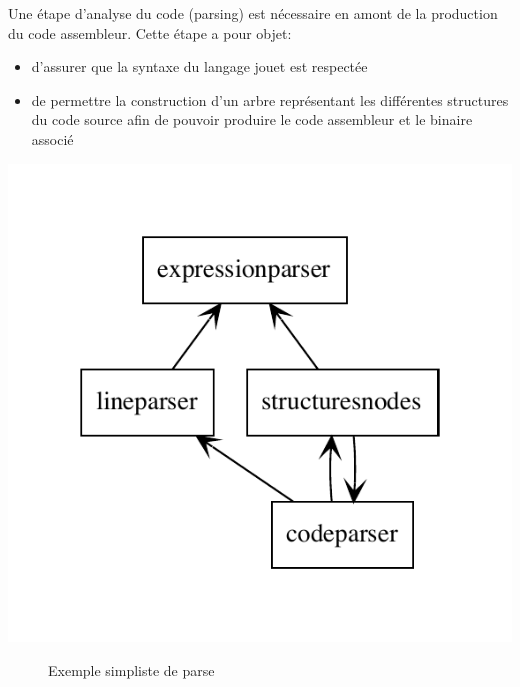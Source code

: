 \begin{minipage}[t]{0.7\textwidth}
	Une étape d'analyse du code (parsing) est nécessaire en amont de la production du code assembleur. Cette étape a pour objet:
\begin{itemize}
	\item d'assurer que la syntaxe du langage jouet est respectée
	\item de permettre la construction d'un arbre représentant les différentes structures du code source afin de pouvoir produire le code assembleur et le binaire associé
\end{itemize}
\end{minipage}
\hfill
\begin{minipage}[t]{0.3\textwidth}
	\vspace{-1.5cm}
	\centering
	\includegraphics[scale=0.7]{./Pictures/parser.pdf}
\end{minipage}

\begin{figure}[h!]
	\centering
	\caption{Exemple simpliste de parse}
\end{figure}


